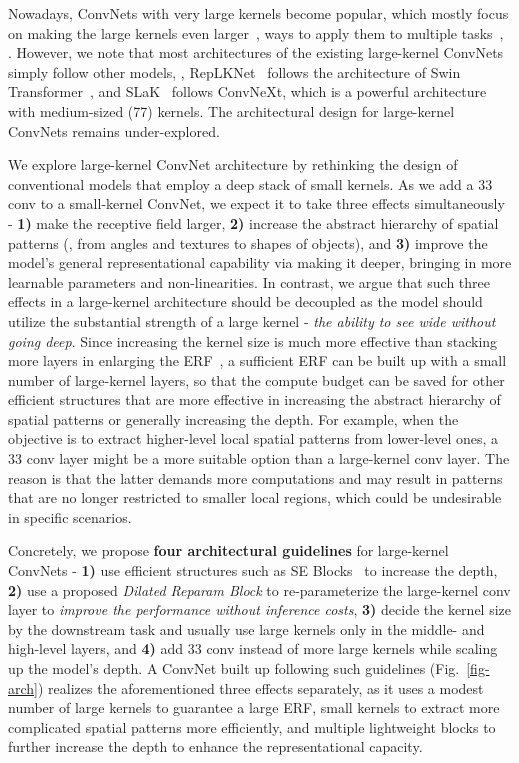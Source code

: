 \documentclass[10pt,twocolumn,letterpaper]{article}
\begin{document}
Nowadays, ConvNets with very large kernels become popular, which mostly focus on making the large kernels even larger~\cite{liu2022more}, ways to apply them to multiple tasks~\cite{chen2023largekernel3d,luo2023lkd,xie2023large}, \etc. However, we note that most architectures of the existing large-kernel ConvNets simply follow other models, \eg, RepLKNet~\cite{ding2022scaling} follows the architecture of Swin Transformer~\cite{liu2021swin}, and SLaK~\cite{liu2022more} follows ConvNeXt, which is a powerful architecture with medium-sized (77) kernels. The architectural design for large-kernel ConvNets remains under-explored.

We explore large-kernel ConvNet architecture by rethinking the design of conventional models that employ a deep stack of small kernels. As we add a 33 conv to a small-kernel ConvNet, we expect it to take three effects simultaneously - \textbf{1)} make the receptive field larger, \textbf{2)} increase the abstract hierarchy of spatial patterns (\eg, from angles and textures to shapes of objects), and \textbf{3)} improve the model's general representational capability via making it deeper, bringing in more learnable parameters and non-linearities. In contrast, we argue that such three effects in a large-kernel architecture should be decoupled as the model should utilize the substantial strength of a large kernel - \emph{the ability to see wide without going deep}. Since increasing the kernel size is much more effective than stacking more layers in enlarging the ERF~\cite{erf}, a sufficient ERF can be built up with a small number of large-kernel layers, so that the compute budget can be saved for other efficient structures that are more effective in increasing the abstract hierarchy of spatial patterns or generally increasing the depth. For example, when the objective is to extract higher-level local spatial patterns from lower-level ones, a 33 conv layer might be a more suitable option than a large-kernel conv layer. The reason is that the latter demands more computations and may result in patterns that are no longer restricted to smaller local regions, which could be undesirable in specific scenarios. 



Concretely, we propose \textbf{four architectural guidelines} for large-kernel ConvNets - \textbf{1)} use efficient structures such as SE Blocks~\cite{hu2018squeeze} to increase the depth, \textbf{2)} use a proposed \emph{Dilated Reparam Block} to re-parameterize the large-kernel conv layer to \emph{improve the performance without inference costs}, \textbf{3)} decide the kernel size by the downstream task and usually use large kernels only in the middle- and high-level layers, and \textbf{4)} add 33 conv instead of more large kernels while scaling up the model's depth. A ConvNet built up following such guidelines (Fig.~\ref{fig-arch}) realizes the aforementioned three effects separately, as it uses a modest number of large kernels to guarantee a large ERF, small kernels to extract more complicated spatial patterns more efficiently, and multiple lightweight blocks to further increase the depth to enhance the representational capacity.
\end{document}
